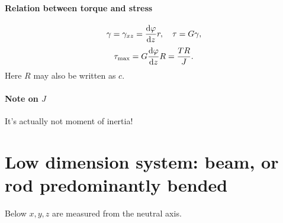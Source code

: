 \documentclass[hyperref, a4paper]{article}
\begin{document}
\paragraph*{Relation between torque and stress}
\begin{equation}
    \gamma = \gamma_{xz} = \dv{\varphi}{z} r, \quad \tau = G \gamma, 
\end{equation}
\begin{equation}
    \tau_\text{max} = G \dv{\varphi}{z} R 
    = \frac{T R}{J} .
\end{equation}
Here $R$ may also be written as $c$.

\paragraph*{Note on $J$} It's actually not moment of inertia! 

\section{Low dimension system: beam, or rod predominantly bended}

Below $x, y, z$ are measured from the neutral axis.
\end{document}
